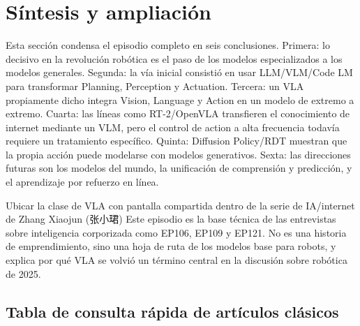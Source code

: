 \section{Síntesis y ampliación}

Esta sección condensa el episodio completo en seis conclusiones. Primera: lo decisivo en la revolución robótica es el paso de los modelos especializados a los modelos generales. Segunda: la vía inicial consistió en usar LLM/VLM/Code LM para transformar Planning, Perception y Actuation. Tercera: un VLA propiamente dicho integra Vision, Language y Action en un modelo de extremo a extremo. Cuarta: las líneas como RT-2/OpenVLA transfieren el conocimiento de internet mediante un VLM, pero el control de action a alta frecuencia todavía requiere un tratamiento específico. Quinta: Diffusion Policy/RDT muestran que la propia acción puede modelarse con modelos generativos. Sexta: las direcciones futuras son los modelos del mundo, la unificación de comprensión y predicción, y el aprendizaje por refuerzo en línea.

\begin{importantbox}{Ubicar la clase de VLA con pantalla compartida dentro de la serie de IA/internet de Zhang Xiaojun (张小珺)}
Este episodio es la base técnica de las entrevistas sobre inteligencia corporizada como EP106, EP109 y EP121. No es una historia de emprendimiento, sino una hoja de ruta de los modelos base para robots, y explica por qué VLA se volvió un término central en la discusión sobre robótica de 2025.
\end{importantbox}

\subsection{Tabla de consulta rápida de artículos clásicos}

